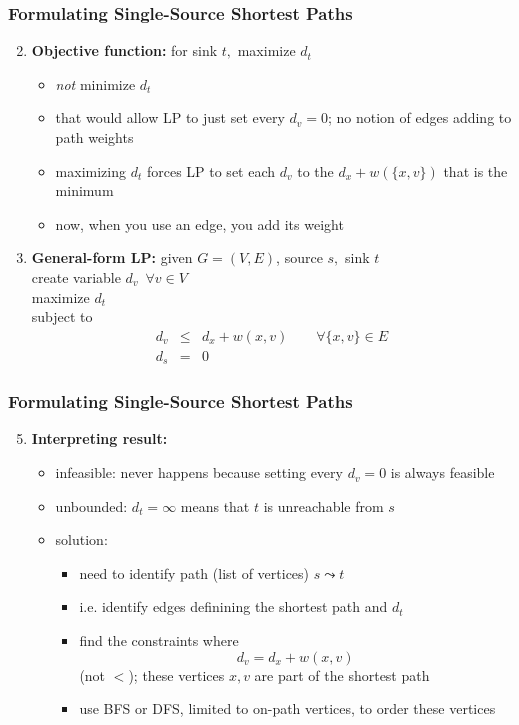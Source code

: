 \documentclass{beamer}
\begin{document}
\begin{frame} \frametitle{Formulating Single-Source Shortest Paths}
\begin{enumerate}
  \setcounter{enumi}{1}
  \item \textbf{Objective function:} for sink $t,$ maximize $d_t$
\begin{itemize}
  \item \emph{not} minimize $d_t$
  \item that would allow LP to just set every $d_v = 0$; no notion of
    edges adding to path weights
  \item maximizing $d_t$ forces LP to set each $d_v$ to the
    $d_x + w(\{x, v\})$ that is the minimum
  \item now, when you use an edge, you add its weight
\end{itemize}
\setcounter{enumi}{3}
\item \textbf{General-form LP:} given $G=(V, E)$, source $s,$ sink $t$ \\
create variable $d_v \enspace \forall v \in V$ \\
maximize $d_t$ \\
subject to
\begin{eqnarray*}
  d_v &\leq& d_x + w(x, v) \qquad \forall \{x, v \} \in E \\
  d_s &=& 0
\end{eqnarray*}
\end{enumerate}
\end{frame}

\begin{frame} \frametitle{Formulating Single-Source Shortest Paths}
  \begin{enumerate}
    \setcounter{enumi}{4}
    \item \textbf{Interpreting result:}
    \begin{itemize}
      \item infeasible: never happens because setting every $d_v=0$ is always feasible
      \item unbounded: $d_t = \infty$ means that $t$ is unreachable from $s$
      \item solution:
      \begin{itemize}
        \item need to identify path (list of vertices) $s \leadsto t$
        \item i.e. identify edges definining the shortest path and $d_t$
        \item find the constraints where
        \[ d_v = d_x + w(x, v) \]
        (not $<$); these vertices $x, v$ are part of the shortest path
        \item use BFS or DFS, limited to on-path vertices, to order these vertices
      \end{itemize}
    \end{itemize}
  \end{enumerate}
\end{frame}
\end{document}
